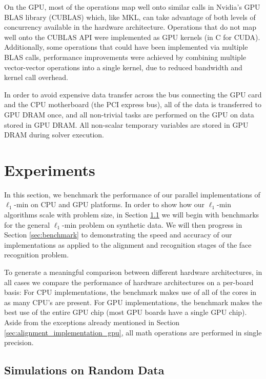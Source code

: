 \documentclass[10pt,twocolumn,letterpaper]{article}
\begin{document}
On the GPU, most of the operations map well onto similar calls in Nvidia's GPU
BLAS library (CUBLAS) which, like MKL, can take advantage of both levels of
concurrency available in the hardware architecture.  Operations that do not map
well onto the CUBLAS API were implemented as GPU kernels (in C for CUDA).
Additionally, some operations that could have been implemented via multiple
BLAS calls, performance improvements were achieved by combining multiple
vector-vector operations into a single kernel, due to reduced bandwidth and
kernel call overhead.  

In order to avoid expensive data transfer across the bus connecting the GPU
card and the CPU motherboard (the PCI express bus), all of the data is
transferred to GPU DRAM once, and all non-trivial tasks are performed on the
GPU on data stored in GPU DRAM.  
All non-scalar temporary variables are stored in GPU DRAM
during solver execution. 

\section{Experiments} \label{sec:experiment} In this section, we benchmark the
performance of our parallel implementations of $\ell_1$-min on CPU and GPU
platforms.  In order to show how our $\ell_1$-min algorithms scale with problem
size, in Section \ref{sec:simulation} we will begin with benchmarks for the
general $\ell_1$-min problem on synthetic data.  We will then progress in
Section \ref{sec:benchmark} to demonstrating the speed and accuracy of our
implementations as applied to the alignment and recognition stages of the face
recognition problem.

To generate a meaningful comparison between different hardware architectures,
in all cases we compare the performance of hardware architectures on a
per-board basis:  For CPU implementations, the benchmark makes use of all of
the cores in as many CPU's are present.  For GPU implementations, the benchmark
makes the best use of the entire GPU chip (most GPU boards have a single GPU
chip).  Aside from the exceptions already mentioned in Section
\ref{sec:alignment_implementation_gpu}, all math operations are performed in
single precision.

\subsection{Simulations on Random Data}
\label{sec:simulation}
\end{document}

